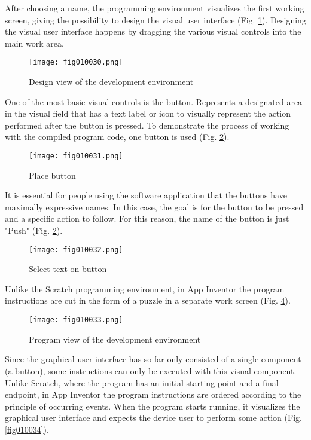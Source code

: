 After choosing a name, the programming environment visualizes the first working screen, giving the possibility to design the visual user interface (Fig. \ref{fig010030}). Designing the visual user interface happens by dragging the various visual controls into the main work area.

\begin{figure}[H]
   \centering
   \texttt{[image: fig010030.png]}
   \caption{Design view of the development environment}
\label{fig010030}
\end{figure}

One of the most basic visual controls is the button. Represents a designated area in the visual field that has a text label or icon to visually represent the action performed after the button is pressed. To demonstrate the process of working with the compiled program code, one button is used (Fig. \ref{fig010031}).

\begin{figure}[H]
   \centering
   \texttt{[image: fig010031.png]}
   \caption{Place button}
\label{fig010031}
\end{figure}

It is essential for people using the software application that the buttons have maximally expressive names. In this case, the goal is for the button to be pressed and a specific action to follow. For this reason, the name of the button is just "Push" (Fig. \ref{fig010031}).

\begin{figure}[H]
   \centering
   \texttt{[image: fig010032.png]}
   \caption{Select text on button}
\label{fig010032}
\end{figure}

Unlike the Scratch programming environment, in App Inventor the program instructions are cut in the form of a puzzle in a separate work screen (Fig. \ref{fig010033}).

\begin{figure}[H]
   \centering
   \texttt{[image: fig010033.png]}
   \caption{Program view of the development environment}
\label{fig010033}
\end{figure}

Since the graphical user interface has so far only consisted of a single component (a button), some instructions can only be executed with this visual component. Unlike Scratch, where the program has an initial starting point and a final endpoint, in App Inventor the program instructions are ordered according to the principle of occurring events. When the program starts running, it visualizes the graphical user interface and expects the device user to perform some action (Fig. \ref{fig010034}).

